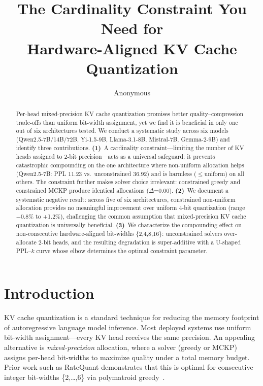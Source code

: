 \documentclass[11pt,a4paper]{article}
\title{The Cardinality Constraint You Need for\\Hardware-Aligned KV Cache Quantization}
\author{Anonymous}
\begin{document}
\maketitle

\begin{abstract}
Per-head mixed-precision KV cache quantization promises better quality--compression trade-offs than uniform bit-width assignment, yet we find it is beneficial in only one out of six architectures tested.
We conduct a systematic study across six models (Qwen2.5-7B/14B/72B, Yi-1.5-9B, Llama-3.1-8B, Mistral-7B, Gemma-2-9B) and identify three contributions.
\textbf{(1)}~A cardinality constraint---limiting the number of KV heads assigned to 2-bit precision---acts as a universal safeguard: it prevents catastrophic compounding on the one architecture where non-uniform allocation helps (Qwen2.5-7B: PPL 11.23 vs.\ unconstrained 36.92) and is harmless ($\leq$uniform) on all others.
The constraint further makes solver choice irrelevant: constrained greedy and constrained MCKP produce identical allocations ($\Delta$=0.00).
\textbf{(2)}~We document a systematic negative result: across five of six architectures, constrained non-uniform allocation provides no meaningful improvement over uniform 4-bit quantization (range $-$0.8\% to +1.2\%), challenging the common assumption that mixed-precision KV cache quantization is universally beneficial.
\textbf{(3)}~We characterize the compounding effect on non-consecutive hardware-aligned bit-widths \{2,4,8,16\}: unconstrained solvers over-allocate 2-bit heads, and the resulting degradation is super-additive with a U-shaped PPL--$k$ curve whose elbow determines the optimal constraint parameter.
\end{abstract}

\section{Introduction}

KV cache quantization is a standard technique for reducing the memory footprint of autoregressive language model inference.
Most deployed systems use uniform bit-width assignment---every KV head receives the same precision.
An appealing alternative is \emph{mixed-precision} allocation, where a solver (greedy or MCKP) assigns per-head bit-widths to maximize quality under a total memory budget.
Prior work such as RateQuant demonstrates that this is optimal for consecutive integer bit-widths \{2,\ldots,6\} via polymatroid greedy~\cite{ratequant2026}.
\end{document}
